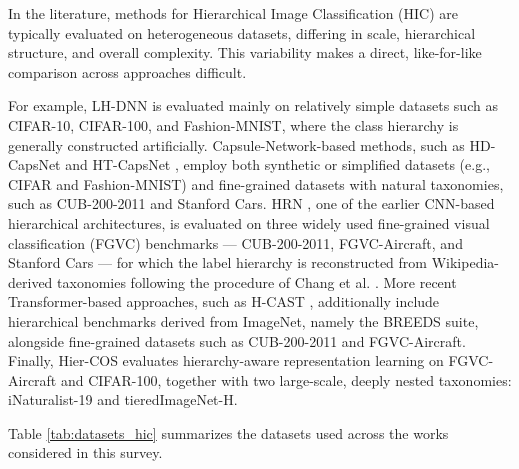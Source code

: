 In the literature, methods for Hierarchical Image Classification (HIC) are typically evaluated on heterogeneous datasets, differing in scale, hierarchical structure, and overall complexity. This variability makes a direct, like-for-like comparison across approaches difficult.

For example, LH-DNN \cite{fiaschi2024informed} is evaluated mainly on relatively simple datasets such as CIFAR-10, CIFAR-100, and Fashion-MNIST, where the class hierarchy is generally constructed artificially. Capsule-Network-based methods, such as HD-CapsNet \cite{noor2024consistency} and HT-CapsNet \cite{noor2025taxonomy}, employ both synthetic or simplified datasets (e.g., CIFAR and Fashion-MNIST) and fine-grained datasets with natural taxonomies, such as CUB-200-2011 and Stanford Cars. HRN \cite{chen2022label}, one of the earlier CNN-based hierarchical architectures, is evaluated on three widely used fine-grained visual classification (FGVC) benchmarks --- CUB-200-2011, FGVC-Aircraft, and Stanford Cars --- for which the label hierarchy is reconstructed from Wikipedia-derived taxonomies following the procedure of Chang et al. \cite{chang2021flamingo}. More recent Transformer-based approaches, such as H-CAST \cite{park2024visually}, additionally include hierarchical benchmarks derived from ImageNet, namely the BREEDS suite, alongside fine-grained datasets such as CUB-200-2011 and FGVC-Aircraft. Finally, Hier-COS \cite{sani2025hiercos} evaluates hierarchy-aware representation learning on FGVC-Aircraft and CIFAR-100, together with two large-scale, deeply nested taxonomies: iNaturalist-19 and tieredImageNet-H.

Table \ref{tab:datasets_hic} summarizes the datasets used across the works considered in this survey.

